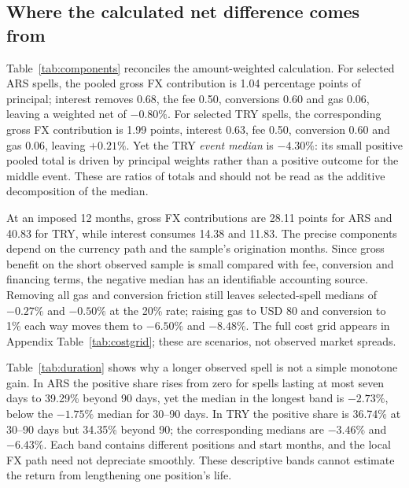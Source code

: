 \documentclass[sn-vancouver,Numbered]{sn-jnl}
\begin{document}
\subsection{Where the calculated net difference comes from}
\begin{table}[htbp]
\caption{Principal-weighted USD cash-flow contributions divided by summed original principal, all in percentage points. Weighted net equals gross FX minus interest, fee, swap and gas in each row. The selected-spell rows use daily references; the 12-month rows use monthly FX. These pooled contributions are \emph{not} medians and can differ in sign from the event median.}
\label{tab:components}\centering\scriptsize

\end{table}
Table~\ref{tab:components} reconciles the amount-weighted calculation. For selected ARS spells, the pooled gross FX contribution is 1.04 percentage points of principal; interest removes 0.68, the fee 0.50, conversions 0.60 and gas 0.06, leaving a weighted net of $-0.80\%$. For selected TRY spells, the corresponding gross FX contribution is 1.99 points, interest 0.63, fee 0.50, conversion 0.60 and gas 0.06, leaving $+0.21\%$. Yet the TRY \emph{event median} is $-4.30\%$: its small positive pooled total is driven by principal weights rather than a positive outcome for the middle event. These are ratios of totals and should not be read as the additive decomposition of the median.

At an imposed 12 months, gross FX contributions are 28.11 points for ARS and 40.83 for TRY, while interest consumes 14.38 and 11.83. The precise components depend on the currency path and the sample's origination months. Since gross benefit on the short observed sample is small compared with fee, conversion and financing terms, the negative median has an identifiable accounting source. Removing all gas and conversion friction still leaves selected-spell medians of $-0.27\%$ and $-0.50\%$ at the 20\% rate; raising gas to USD 80 and conversion to 1\% each way moves them to $-6.50\%$ and $-8.48\%$. The full cost grid appears in Appendix Table~\ref{tab:costgrid}; these are scenarios, not observed market spreads.
\begin{table}[t]
\caption{Selected clean-spell duration bands at daily published FX marks. Net values are hypothetical LCU financing benefits evaluated at observed spell lengths. N is the number of repaid spells per currency band, not people. Positive is the percentage with positive conditional net benefit.}
\label{tab:duration}\centering\small

\end{table}
Table~\ref{tab:duration} shows why a longer observed spell is not a simple monotone gain. In ARS the positive share rises from zero for spells lasting at most seven days to 39.29\% beyond 90 days, yet the median in the longest band is $-2.73\%$, below the $-1.75\%$ median for 30--90 days. In TRY the positive share is 36.74\% at 30--90 days but 34.35\% beyond 90; the corresponding medians are $-3.46\%$ and $-6.43\%$. Each band contains different positions and start months, and the local FX path need not depreciate smoothly. These descriptive bands cannot estimate the return from lengthening one position's life.
\end{document}
